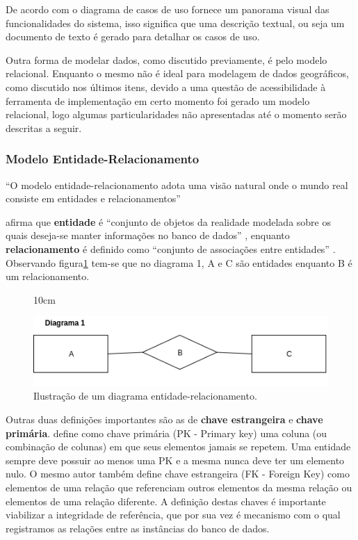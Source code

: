 De acordo com  o diagrama de casos de uso fornece um panorama visual das funcionalidades do sistema, isso significa que uma descrição textual, ou seja um documento de texto é gerado para detalhar os casos de uso.

Outra forma de modelar dados, como discutido previamente, é pelo modelo relacional. Enquanto o mesmo não é ideal para modelagem de dados geográficos, como discutido nos últimos itens, devido a uma questão de acessibilidade à ferramenta de implementação em certo momento foi gerado um modelo relacional, logo algumas particularidades não apresentadas até o momento serão descritas a seguir.

\subsubsection{Modelo Entidade-Relacionamento}
``O modelo entidade-relacionamento adota uma
visão natural onde o mundo real consiste em entidades e relacionamentos'' \cite[p.1]{codd1970relational}

 afirma que \textbf{entidade} é ``conjunto de objetos da realidade modelada sobre os quais deseja-se manter informações no banco de dados'' \cite[p.23]{heuser1998projeto}, enquanto \textbf{relacionamento} é definido como ``conjunto de associações entre entidades'' \cite[p.24]{heuser1998projeto}. Observando  figura\ref{relacional_a} tem-se que no diagrama 1, A e C são entidades enquanto B é um relacionamento.

\begin{figure}[!ht]{10cm}
  \caption{Ilustração de um diagrama entidade-relacionamento.} \label{relacional_a}
  \includegraphics[width=0.75\hsize]{figuras/relacional_a.png}
\end{figure}

Outras duas definições importantes são as de \textbf{chave estrangeira} e \textbf{chave primária}.
 define como chave primária (PK - Primary key) uma coluna (ou combinação de colunas) em que seus elementos jamais se repetem. Uma entidade sempre deve possuir ao menos uma PK e a mesma nunca deve ter um elemento nulo. O mesmo autor também define chave estrangeira (FK - Foreign Key) como elementos de uma relação que referenciam outros elementos da mesma relação ou elementos de uma relação diferente. A definição destas chaves é importante viabilizar a integridade de referência, que por sua vez é mecanismo com o qual registramos as relações entre as instâncias do banco de dados.

